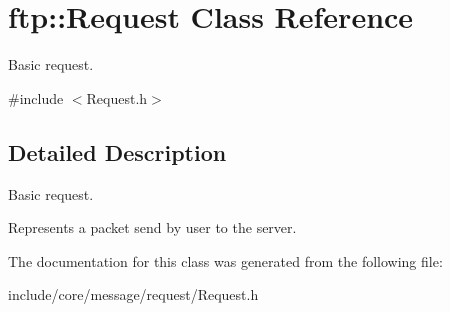 \hypertarget{classftp_1_1_request}{\section{ftp\-:\-:Request Class Reference}
\label{classftp_1_1_request}
}


Basic request.  




{\ttfamily \#include $<$Request.\-h$>$}



\subsection{Detailed Description}
Basic request. 

Represents a packet send by user to the server. 

The documentation for this class was generated from the following file\-:\begin{DoxyCompactItemize}
\item 
include/core/message/request/Request.\-h\end{DoxyCompactItemize}
